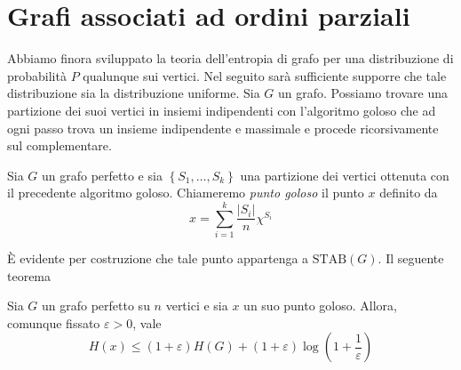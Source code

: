 \section{Grafi associati ad ordini parziali}

Abbiamo finora sviluppato la teoria dell'entropia di grafo per una distribuzione di probabilità \(P\) qualunque sui vertici. Nel seguito sarà sufficiente supporre che tale distribuzione sia la distribuzione uniforme.
Sia \(G\) un grafo. Possiamo trovare una partizione dei suoi vertici in insiemi indipendenti con l'algoritmo goloso che ad ogni passo trova un insieme indipendente e massimale e procede ricorsivamente sul complementare. 
\begin{definition}
	Sia \(G\) un grafo perfetto e sia \(\left\{S_1,\dots,S_k\right\}\) una partizione dei vertici ottenuta con il precedente algoritmo goloso. Chiameremo \emph{punto goloso} il punto \(x\) definito da
	\[x=\sum_{i=1}^k\frac{|S_i|}{n}\chi^{S_i}\]
\end{definition}
È evidente per costruzione che tale punto appartenga a \(\text{STAB}(G)\). Il seguente teorema
\begin{theorem}
	Sia \(G\) un grafo perfetto su \(n\) vertici e sia \(x\) un suo punto goloso. Allora, comunque fissato \(\varepsilon>0\), vale
	\[H(x)\le(1+\varepsilon)H(G)+(1+\varepsilon)\log\left(1+\frac{1}{\varepsilon}\right)\]
\end{theorem}
